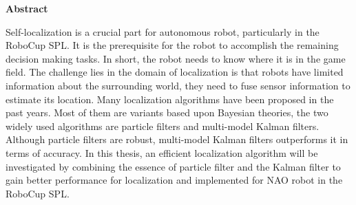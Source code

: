 \thispagestyle{empty}
\vspace*{1.0cm}

\begin{center}
   \LARGE \textbf{Abstract}
\end{center}

\vspace*{0.5cm}

\noindent

Self-localization is a crucial part for autonomous robot, particularly in the RoboCup \gls{SPL}. It is the prerequisite for the robot to accomplish the remaining decision making tasks. In short, the robot needs to know where it is in the game field.  The challenge lies in the domain of localization is that robots have limited information about the surrounding world, they need to fuse sensor information to estimate its location. Many localization algorithms have been proposed in the past years. Most of them are variants based upon Bayesian theories, the two widely used algorithms are particle filters and multi-model Kalman filters. Although particle filters are robust, multi-model Kalman filters outperforms it in terms of accuracy. In this thesis, an efficient localization algorithm will be investigated by combining the essence of particle filter and the Kalman filter to gain better performance for localization and implemented for NAO robot in the RoboCup \gls{SPL}.
